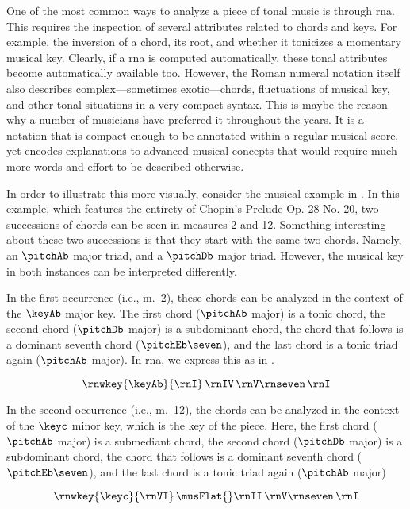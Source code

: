 
One of the most common ways to analyze a piece of tonal
music is through \gls{rna}. This requires the inspection of
several attributes related to chords and keys. For example,
the inversion of a chord, its root, and whether it tonicizes
a momentary musical key. Clearly, if a \gls{rna} is computed
automatically, these tonal attributes become automatically
available too. However, the Roman numeral notation itself
also describes complex---sometimes exotic---chords,
fluctuations of musical key, and other tonal situations in a
very compact syntax. This is maybe the reason why a number
of musicians have preferred it throughout the years. It is a
notation that is compact enough to be annotated within a
regular musical score, yet encodes explanations to advanced
musical concepts that would require much more words and
effort to be described otherwise.

In order to illustrate this more visually, consider the
musical example in . In this
example, which features the entirety of Chopin's Prelude Op.
28 No. 20, two successions of chords can be seen in measures
2 and 12. Something interesting about these two successions
is that they start with the same two chords. Namely, an
$\pitchAb$ major triad, and a $\pitchDb$ major triad.
However, the musical key in both instances can be
interpreted differently. 

In the first occurrence (i.e., m.~2), these chords can be
analyzed in the context of the $\keyAb$ major key. The first
chord ($\pitchAb$ major) is a tonic chord, the second chord
($\pitchDb$ major) is a subdominant chord, the chord that
follows is a dominant seventh chord ($\pitchEb\seven$), and
the last chord is a tonic triad again ($\pitchAb$ major). In
\gls{rna}, we express this as in .

\begin{equation}
    \label{eq:succession1}
    \rnwkey{\keyAb}{\rnI} \, \rnIV \, \rnV\rnseven \, \rnI
\end{equation}

In the second occurrence (i.e., m.~12), the chords can be
analyzed in the context of the $\keyc$ minor key, which is
the key of the piece. Here, the first chord ($\pitchAb$
major) is a submediant chord, the second chord ($\pitchDb$
major) is a subdominant chord, the chord that follows is a
dominant seventh chord ($\pitchEb\seven$), and the last
chord is a tonic triad again ($\pitchAb$ major)

\begin{equation}
    \label{eq:succession2}
    \rnwkey{\keyc}{\rnVI} \, \musFlat{}\rnII \, \rnV\rnseven \, \rnI
\end{equation}

